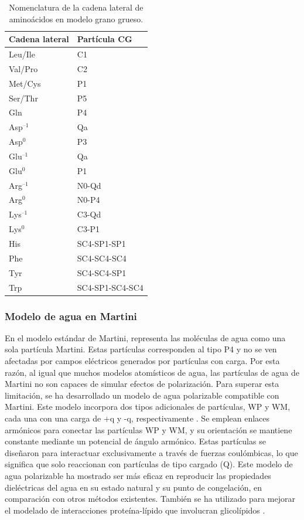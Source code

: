 \begin{table}[H]
\centering
\caption[]{Nomenclatura de la cadena lateral de aminoácidos en modelo grano grueso.}
\label{tab:cg_particles}
\begin{tabular}{@{}ll@{}}
\toprule
\multicolumn{1}{l}{Cadena lateral} & \multicolumn{1}{l}{Partícula CG} \\ \midrule
Leu/Ile  & C1              \\
Val/Pro  & C2              \\
Met/Cys  & P1              \\
Ser/Thr  & P5              \\
Gln      & P4              \\
Asp$^\text{--1}$ & Qa              \\
Asp$^0$  & P3              \\
Glu$^\text{--1}$ & Qa              \\
Glu$^0$  & P1              \\
Arg$^\text{--1}$ & N0-Qd           \\
Arg$^0$  & N0-P4            \\
Lys$^\text{--1}$ & C3-Qd           \\
Lys$^0$  & C3-P1           \\
His      & SC4-SP1-SP1     \\
Phe      & SC4-SC4-SC4     \\
Tyr      & SC4-SC4-SP1     \\
Trp      & SC4-SP1-SC4-SC4 \\ \bottomrule
\end{tabular}
\end{table}


\subsubsection{Modelo de agua en Martini}

En el modelo estándar de Martini, representa las moléculas de agua como una sola partícula Martini. Estas partículas corresponden al tipo P4 y no se ven afectadas por campos eléctricos generados por partículas con carga. Por esta razón, al igual que muchos modelos atomísticos de agua, las partículas de agua de Martini no son capaces de simular efectos de polarización. Para superar esta limitación, se ha desarrollado un modelo de agua polarizable compatible con Martini. Este modelo incorpora dos tipos adicionales de partículas, WP y WM, cada una con una carga de +q y -q, respectivamente \citep{Gu2017, Yesylevskyy2010}.
Se emplean enlaces armónicos para conectar las partículas WP y WM, y su orientación se mantiene constante mediante un potencial de ángulo armónico. Estas partículas se diseñaron para interactuar exclusivamente a través de fuerzas coulómbicas, lo que significa que solo reaccionan con partículas de tipo cargado (Q). Este modelo de agua polarizable ha mostrado ser más eficaz en reproducir las propiedades dieléctricas del agua en su estado natural y su punto de congelación, en comparación con otros métodos existentes. También se ha utilizado para mejorar el modelado de interacciones proteína-lípido que involucran glicolípidos \citep{Gu2017}.

